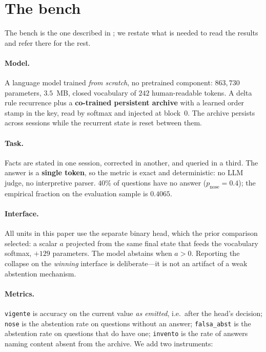 \documentclass[11pt,a4paper]{article}
\begin{document}
\section{The bench}
\label{sec:bench}

The bench is the one described in \citet{speranza2026abstention}; we restate what is needed to read
the results and refer there for the rest.

\paragraph{Model.} A language model trained \emph{from scratch}, no pretrained component:
$863{,}730$ parameters, $3.5$~MB, closed vocabulary of $242$ human-readable tokens. A delta rule
recurrence plus a \textbf{co-trained persistent archive} with a learned order stamp in the key, read
by softmax and injected at block~0. The archive persists across sessions while the recurrent state is
reset between them.

\paragraph{Task.} Facts are stated in one session, corrected in another, and queried in a third. The
answer is a \textbf{single token}, so the metric is exact and deterministic: no LLM judge, no
interpretive parser. $40\%$ of questions have no answer ($p_{\mathrm{nose}} = 0.4$); the empirical
fraction on the evaluation sample is $0.4065$.

\paragraph{Interface.} All units in this paper use the separate binary head, which the prior
comparison selected: a scalar $a$ projected from the same final state that feeds the vocabulary
softmax, $+129$ parameters. The model abstains when $a > 0$. Reporting the collapse on the
\emph{winning} interface is deliberate---it is not an artifact of a weak abstention mechanism.

\paragraph{Metrics.} \texttt{vigente} is accuracy on the current value \emph{as emitted}, i.e.\ after
the head's decision; \texttt{nose} is the abstention rate on questions without an answer;
\texttt{falsa\_abst} is the abstention rate on questions that do have one; \texttt{invento} is the
rate of answers naming content absent from the archive. We add two instruments:
\end{document}
